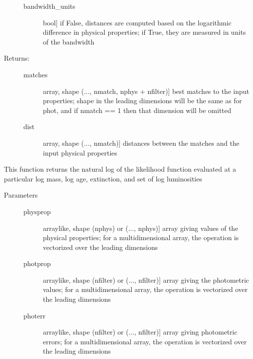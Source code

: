 \documentclass[letterpaper,10pt,english]{sphinxmanual}
\begin{document}
\begin{fulllineitems}
\begin{fulllineitems}
\begin{description}
\begin{description}
\item[{bandwidth\_units}] \leavevmode{[}bool{]}
if False, distances are computed based on the
logarithmic difference in physical properties; if True,
they are measured in units of the bandwidth

\end{description}

\item[{Returns:}] \leavevmode\begin{description}
\item[{matches}] \leavevmode{[}array, shape (..., nmatch, nphys + nfilter){]}
best matches to the input properties; shape in the
leading dimensions will be the same as for phot, and if
nmatch == 1 then that dimension will be omitted

\item[{dist}] \leavevmode{[}array, shape (..., nmatch){]}
distances between the matches and the input physical
properties

\end{description}

\end{description}

\end{fulllineitems}


\begin{fulllineitems}
\label{bayesphot:slugpy.bayesphot.bp.bp.logL}
This function returns the natural log of the likelihood
function evaluated at a particular log mass, log age,
extinction, and set of log luminosities
\begin{description}
\item[{Parameters}] \leavevmode\begin{description}
\item[{physprop}] \leavevmode{[}arraylike, shape (nphys) or (..., nphys){]}
array giving values of the physical properties; for a
multidimensional array, the operation is vectorized over
the leading dimensions

\item[{photprop}] \leavevmode{[}arraylike, shape (nfilter) or (..., nfilter){]}
array giving the photometric values; for a
multidimensional array, the operation is vectorized over
the leading dimensions

\item[{photerr}] \leavevmode{[}arraylike, shape (nfilter) or (..., nfilter){]}
array giving photometric errors; for a multidimensional
array, the operation is vectorized over the leading
dimensions


\end{description}
\end{description}
\end{fulllineitems}
\end{fulllineitems}
\end{document}

